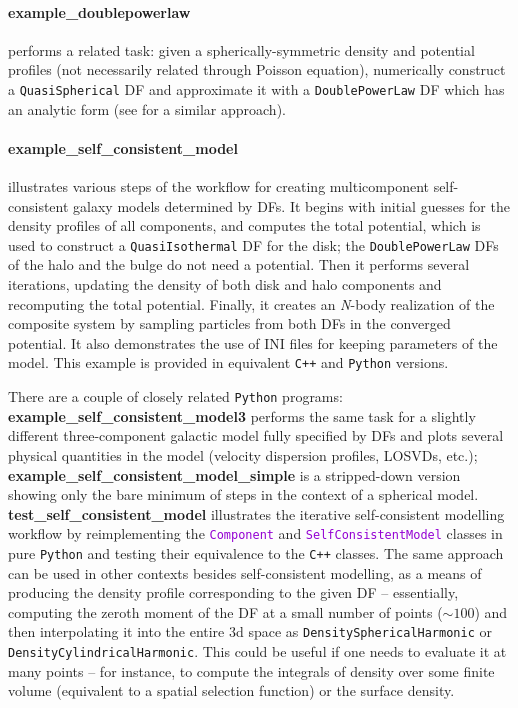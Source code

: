 \documentclass[12pt]{article}
\newcommand{\Nbody}{\textsl{N}-body\xspace}
\newcommand{\Cpp}  {\texttt{C++}\xspace}
\newcommand{\Python}{\texttt{Python}\xspace}
\newcommand{\ttt}[1]{\textcolor{darkviolet}{\texttt{#1}}}
\newcommand{\ppp}[1]{\textcolor{darkolive} {\texttt{#1}}}
\begin{document}
\paragraph{example_doublepowerlaw} performs a related task: given a spherically-symmetric density and potential profiles (not necessarily related through Poisson equation), numerically construct a \ppp{QuasiSpherical} DF and approximate it with a \ppp{DoublePowerLaw} DF which has an analytic form (see \cite{Jeffreson2017} for a similar approach).

\paragraph{example_self_consistent_model} \label{sec:ExampleSCM} illustrates various steps of the workflow for creating multicomponent self-consistent galaxy models determined by DFs. It begins with initial guesses for the density profiles of all components, and computes the total potential, which is used to construct a \ppp{QuasiIsothermal} DF for the disk; the \ppp{DoublePowerLaw} DFs of the halo and the bulge do not need a potential. Then it performs several iterations, updating the density of both disk and halo components and recomputing the total potential. Finally, it creates an \Nbody realization of the composite system by sampling particles from both DFs in the converged potential. It also demonstrates the use of INI files for keeping parameters of the model. This example is provided in equivalent \Cpp and \Python versions.

There are a couple of closely related \Python programs:\\
\textbf{example_self_consistent_model3} performs the same task for a slightly different three-component galactic model fully specified by DFs and plots several physical quantities in the model (velocity dispersion profiles, LOSVDs, etc.);\\
\textbf{example_self_consistent_model_simple} is a stripped-down version showing only the bare minimum of steps in the context of a spherical model.\\
\textbf{test_self_consistent_model} illustrates the iterative self-consistent modelling workflow by reimplementing the \ttt{Component} and \ttt{SelfConsistentModel} classes in pure \Python and testing their equivalence to the \Cpp classes. The same approach can be used in other contexts besides self-consistent modelling, as a means of producing the density profile corresponding to the given DF -- essentially, computing the zeroth moment of the DF at a small number of points ($\sim 100$) and then interpolating it into the entire 3d space as \ppp{DensitySphericalHarmonic} or \ppp{DensityCylindricalHarmonic}. This could be useful if one needs to evaluate it at many points -- for instance, to compute the integrals of density over some finite volume (equivalent to a spatial selection function) or the surface density.
\end{document}
